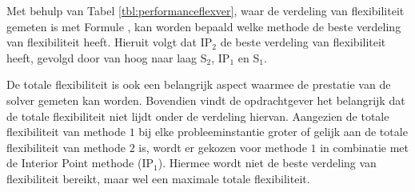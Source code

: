 Met behulp van Tabel \ref{tbl:performanceflexver}, waar de verdeling van flexibiliteit gemeten is met Formule \label{eq:mse}, kan worden bepaald welke methode de beste verdeling van flexibiliteit heeft. Hieruit volgt dat IP$_2$ de beste verdeling van flexibiliteit heeft, gevolgd door van hoog naar laag S$_2$, IP$_1$ en S$_1$. 

De totale flexibiliteit is ook een belangrijk aspect waarmee de prestatie van de solver gemeten kan worden. Bovendien vindt de opdrachtgever het belangrijk dat de totale flexibiliteit niet lijdt onder de verdeling hiervan. Aangezien de totale flexibiliteit van methode $1$ bij elke probleeminstantie groter of gelijk aan de totale flexibiliteit van methode $2$ is, wordt er gekozen voor methode $1$ in combinatie met de Interior Point methode (IP$_1$). Hiermee wordt niet de beste verdeling van flexibiliteit bereikt, maar wel een maximale totale flexibiliteit.
